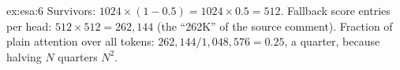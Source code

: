 \begin{solution}{ex:esa:6}
Survivors: $1024\times(1 - 0.5) = 1024\times0.5 = 512$. Fallback score entries per head:
$512\times512 = 262{,}144$ (the ``262K'' of the source comment). Fraction of plain attention over
all tokens: $262{,}144/1{,}048{,}576 = 0.25$, a quarter, because halving $N$ quarters $N^2$.
\end{solution}
